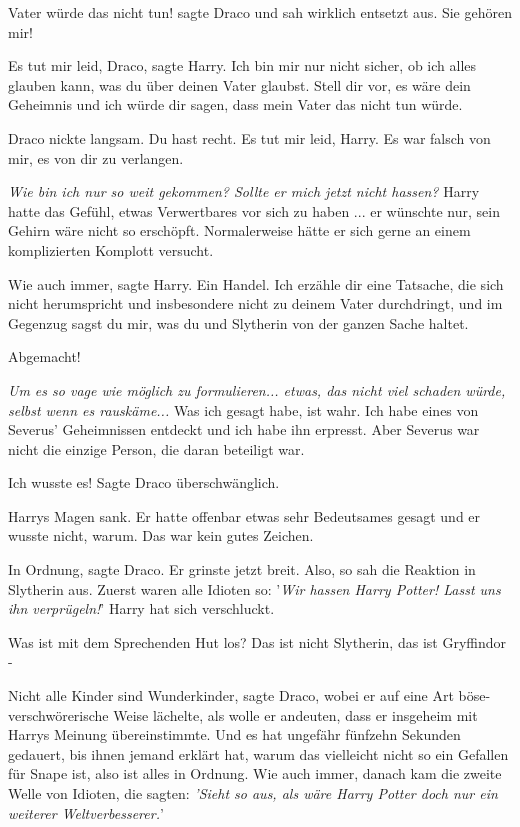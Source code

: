 \glqq Vater würde das nicht tun!\grqq{} sagte Draco und sah wirklich entsetzt
aus. \glqq Sie gehören mir!\grqq{}

\glqq Es tut mir leid, Draco\grqq{}, sagte Harry. \glqq Ich bin mir nur nicht
sicher, ob ich alles glauben kann, was du über deinen Vater glaubst. Stell dir
vor, es wäre dein Geheimnis und ich würde dir sagen, dass mein Vater das nicht
tun würde.\grqq{}

Draco nickte langsam. \glqq Du hast recht. Es tut mir leid, Harry. Es war falsch
von mir, es von dir zu verlangen.\grqq{}

\emph{Wie bin ich nur so weit gekommen? Sollte er mich jetzt nicht hassen?}
Harry hatte das Gefühl, etwas Verwertbares vor sich zu haben ... er wünschte
nur, sein Gehirn wäre nicht so erschöpft. Normalerweise hätte er sich gerne an
einem komplizierten Komplott versucht.

\glqq Wie auch immer\grqq{}, sagte Harry. \glqq Ein Handel. Ich erzähle dir eine
Tatsache, die sich nicht herumspricht und insbesondere nicht zu deinem Vater
durchdringt, und im Gegenzug sagst du mir, was du und Slytherin von der ganzen
Sache haltet.\grqq{}

\glqq Abgemacht!\grqq{}

\emph{Um es so vage wie möglich zu formulieren... etwas, das nicht viel schaden
würde, selbst wenn es rauskäme...} \glqq Was ich gesagt habe, ist wahr. Ich habe
eines von Severus' Geheimnissen entdeckt und ich habe ihn erpresst. Aber Severus
war nicht die einzige Person, die daran beteiligt war.\grqq{}

\glqq Ich wusste es!\grqq{} Sagte Draco überschwänglich.

Harrys Magen sank. Er hatte offenbar etwas sehr Bedeutsames gesagt und er wusste
nicht, warum. Das war kein gutes Zeichen.

\glqq In Ordnung\grqq{}, sagte Draco. Er grinste jetzt breit. \glqq Also, so sah
die Reaktion in Slytherin aus. Zuerst waren alle Idioten so: '\emph{Wir hassen
Harry Potter! Lasst uns ihn verprügeln!}'\grqq{} Harry hat sich verschluckt.

\glqq Was ist mit dem Sprechenden Hut los? Das ist nicht Slytherin, das ist
Gryffindor -\grqq{}

\glqq Nicht alle Kinder sind Wunderkinder\grqq{}, sagte Draco, wobei er auf eine
Art böse-verschwörerische Weise lächelte, als wolle er andeuten, dass er
insgeheim mit Harrys Meinung übereinstimmte. \glqq Und es hat ungefähr fünfzehn
Sekunden gedauert, bis ihnen jemand erklärt hat, warum das vielleicht nicht so
ein Gefallen für Snape ist, also ist alles in Ordnung. Wie auch immer, danach
kam die zweite Welle von Idioten, die sagten: \emph{'Sieht so aus, als wäre
Harry Potter doch nur ein weiterer Weltverbesserer.}'\grqq{}

